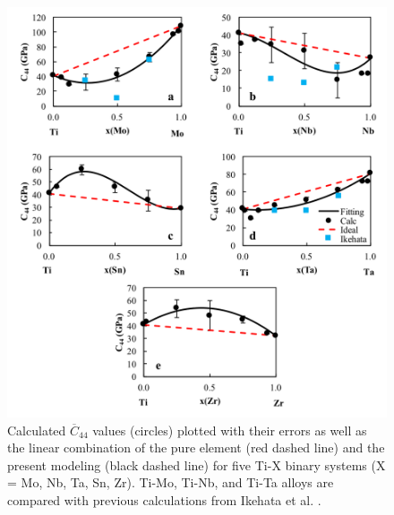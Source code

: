 \pagebreak
\begin{figure}[H]
	\centering
	\includegraphics[width=\textwidth]{Chapter-5/Figures/tixc44.png}
	\caption{Calculated $\overline{C}_{44}$ values (circles) plotted with their errors as well as the linear combination of the pure element (red dashed line) and the present modeling (black dashed line) for five Ti-X binary systems (X = Mo, Nb, Ta, Sn, Zr). Ti-Mo, Ti-Nb, and Ti-Ta alloys are compared with previous calculations from Ikehata et al. \cite{Ikehata2004}.}
	\label{Ch5-figure:tixc44}
\end{figure}

